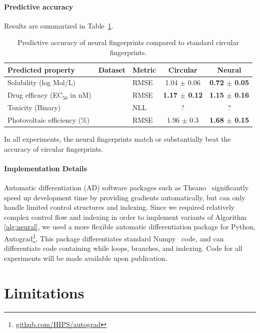 \documentclass{article}
\begin{document}
\paragraph{Predictive accuracy}
Results are summarized in Table~\ref{table:main results}.
%
\begin{table}
\begin{tabular}{lll|cc}
Predicted property              & Dataset                     & Metric & Circular        & Neural   \\
\midrule
Solubility (log Mol/L)          & \citet{delaney_data_2004}   &   RMSE & 1.04 $\pm$ 0.06 & \bf{0.72} $\pm$ 0.05 \\
Drug efficacy (EC$_{50}$ in nM) & \citet{gamo2010thousands}   &   RMSE & \bf{1.17} $\pm$ 0.12 & \bf{1.15} $\pm$ 0.16  \\
Toxicity (Binary)               & \citet{tox21}               &   NLL  & ?               &      ?               \\
Photovoltaic efficiency (\%)    & \citet{hachmann2011harvard} &  RMSE  & 1.96 $\pm$ 0.3  & \bf{1.68} $\pm$ 0.15
\end{tabular}
\label{table:main results}
\caption{Predictive accuracy of neural fingerprints compared to standard circular fingerprints.}
\end{table}
%
In all experiments, the neural fingerprints match or substantially beat the accuracy of circular fingerprints.

\paragraph{Implementation Details}
Automatic differentiation (AD) software packages such as
Theano~\citep{Bastien-Theano-2012} significantly speed up development time by providing gradients automatically, but can only handle limited control structures and indexing.
Since we required relatively complex control flow and indexing in order to implement variants of Algorithm \ref{alg:neural}, we used a more flexible automatic differentiation package for Python, Autograd\footnote{\url{github.com/HIPS/autograd}}.
This package differentiates standard Numpy~\citep{oliphant2007python} code, and can differentiate code containing while loops, branches, and indexing.
Code for all experiments will be made available upon publication.

\section{Limitations}
\end{document}
